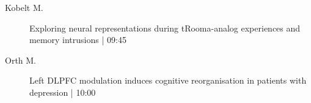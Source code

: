 \begin{symposium}
\begin{description}
                \item [ Kobelt M.] Exploring neural representations during tRooma-analog experiences and memory intrusions \textcolor{mygray}{ | 09:45}    
                
                \item [ Orth M.] Left DLPFC modulation induces cognitive reorganisation in patients with depression \textcolor{mygray}{ | 10:00}    
                
            \end{description} 
            \end{symposium}
            